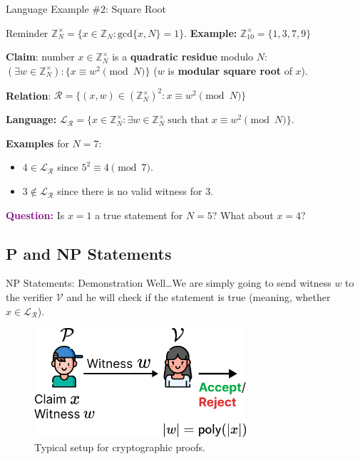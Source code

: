\documentclass{zkdl-presentation-template}
\begin{document}
    \begin{frame}{Language Example \#2: Square Root}
        \begin{block}{Reminder}
            $\mathbb{Z}_N^{\times} = \{x \in \mathbb{Z}_N: \text{gcd}\{x,N\}=1\}$. \textbf{Example:} $\mathbb{Z}_{10}^{\times} = \{1,3,7,9\}$
        \end{block}

        \begin{example}
            \textbf{Claim}: number $x \in \mathbb{Z}_N^{\times}$ is a \textbf{quadratic residue} modulo $N$: $(\exists w \in \mathbb{Z}_N^{\times}): \{x \equiv w^2 \pmod{N}\}$ ($w$ is \textbf{modular square root} of $x$). 
            
            \textbf{Relation}: $\mathcal{R} = \{ (x, w) \in (\mathbb{Z}_N^{\times})^2: x \equiv w^2 \pmod{N} \}$
        
            \textbf{Language:} $\mathcal{L}_{\mathcal{R}} = \{x \in \mathbb{Z}_N^{\times}: \exists w \in \mathbb{Z}_N^{\times} \; \text{such that} \; x \equiv w^2 \pmod{N}\}$. 
            
            \textbf{Examples} for $N=7$: 
            \begin{itemize}
                \item $4 \in \mathcal{L}_{\mathcal{R}}$ since $5^2 \equiv 4 \pmod{7}$. 
                \item $3 \not\in \mathcal{L}_{\mathcal{R}}$ since there is no valid witness for $3$.
            \end{itemize}
        \end{example}

        \textcolor{purple}{\textbf{Question:}} Is $x=1$ a true statement for $N=5$? What about $x=4$?
    \end{frame}

    \subsection{P and NP Statements}

    \begin{frame}{NP Statements: Demonstration}
        Well\ldots We are simply going to send witness $w$ to the verifier $\mathcal{V}$ and he will check if the statement is true (meaning, whether $x \in \mathcal{L}_{\mathcal{R}}$).

        \begin{figure}
            \centering
            \includegraphics[width=0.7\textwidth]{images/lecture_6/np.pdf}
            \caption{Typical setup for cryptographic proofs.}
        \end{figure}
    \end{frame}
\end{document}
